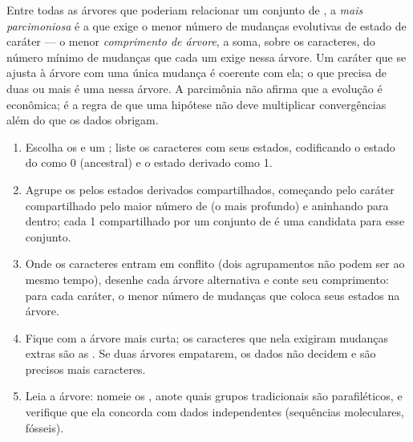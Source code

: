 \begin{definition}[Parcimônia]\label{def:b1:classifying-biodiversity:parsimony}
Entre todas as árvores que poderiam relacionar um conjunto de ,
a \emph{mais parcimoniosa} é a que exige o menor número de mudanças
evolutivas de estado de caráter --- o menor \emph{comprimento de
árvore}, a soma, sobre os caracteres, do número mínimo de mudanças que
cada um exige nessa árvore. Um caráter que se ajusta à árvore com uma
única mudança é coerente com ela; o que precisa de duas ou mais é uma
 nessa árvore. A parcimônia não afirma que a evolução é
econômica; é a regra de que uma hipótese não deve multiplicar
convergências além do que os dados obrigam.
\end{definition}

\begin{method}\label{met:b1:classifying-biodiversity:cladogram}
\begin{enumerate}
  \item Escolha os  e um ; liste os caracteres com
        seus estados, codificando o estado do  como 0
        (ancestral) e o estado derivado como 1.
  \item Agrupe os  pelos estados derivados compartilhados,
        começando pelo caráter compartilhado pelo maior número de
         (o  mais profundo) e aninhando para dentro; cada 1
        compartilhado por um conjunto de  é uma 
        candidata para esse conjunto.
  \item Onde os caracteres entram em conflito (dois agrupamentos não
        podem ser  ao mesmo tempo), desenhe cada árvore
        alternativa e conte seu comprimento: para cada caráter, o menor
        número de mudanças que coloca seus estados na árvore.
  \item Fique com a árvore mais curta; os caracteres que nela exigiram
        mudanças extras são as . Se duas árvores empatarem,
        os dados não decidem e são precisos mais caracteres.
  \item Leia a árvore: nomeie os , anote quais grupos
        tradicionais são parafiléticos, e verifique que ela concorda
        com dados independentes (sequências moleculares, fósseis).
\end{enumerate}
\end{method}

